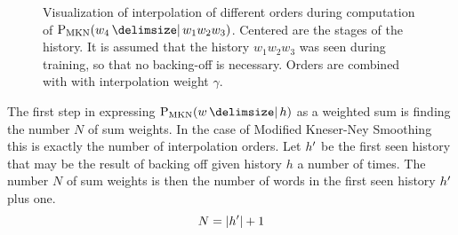 \begin{figure}
  \centering
  \caption{
    Visualization of interpolation of different orders during computation of
    $\ProbMKN{w_4}{w_1 w_2 w_3}$.
    Centered are the stages of the history.
    It is assumed that the history $w_1 w_2 w_3$ was seen during training, so
    that no backing-off is necessary.
    Orders are combined with with interpolation weight $\gamma$.
  }
  \label{fig:history-mkn}
\end{figure}

The first step in expressing $\ProbMKN{w}{h}$ as a weighted sum is finding the
number $N$ of sum weights.
In the case of Modified Kneser-Ney Smoothing this is exactly the number of
interpolation orders.
Let $h^\prime$ be the first seen history that may be the result of backing
off given history $h$ a number of times.
The number $N$ of sum weights is then the number of words in the first seen
history $h^\prime$ plus one.
\begin{equation}
  N = \left|h^\prime\right| + 1
\end{equation}

